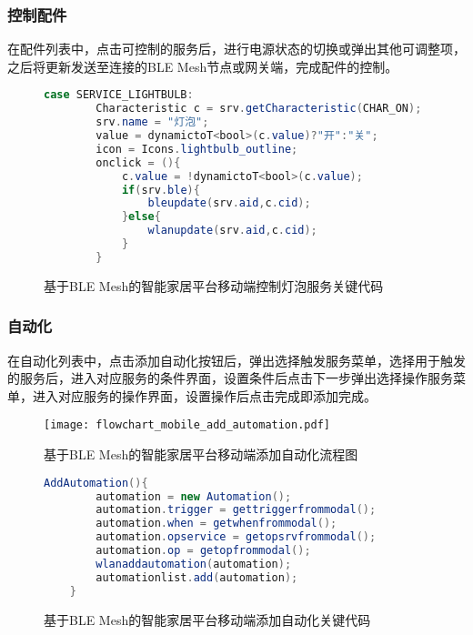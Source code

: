 \subsubsection{控制配件}
在配件列表中，点击可控制的服务后，进行电源状态的切换或弹出其他可调整项，之后将更新发送至连接的BLE Mesh节点或网关端，完成配件的控制。

\begin{figure}[H]
    \centering
    \begin{lstlisting}[language=Java]
    case SERVICE_LIGHTBULB:
        Characteristic c = srv.getCharacteristic(CHAR_ON);
        srv.name = "灯泡";
        value = dynamictoT<bool>(c.value)?"开":"关";
        icon = Icons.lightbulb_outline;
        onclick = (){
            c.value = !dynamictoT<bool>(c.value);
            if(srv.ble){
                bleupdate(srv.aid,c.cid);
            }else{
                wlanupdate(srv.aid,c.cid);
            }
        }
    \end{lstlisting}
    \caption{基于BLE Mesh的智能家居平台移动端控制灯泡服务关键代码}
    \label{fig:code_mobile_control_lightbulb}
\end{figure}

\subsubsection{自动化}
在自动化列表中，点击添加自动化按钮后，弹出选择触发服务菜单，选择用于触发的服务后，进入对应服务的条件界面，设置条件后点击下一步弹出选择操作服务菜单，进入对应服务的操作界面，设置操作后点击完成即添加完成。

\begin{figure}[H]
    \centering
    \texttt{[image: flowchart\_mobile\_add\_automation.pdf]}
    \caption{基于BLE Mesh的智能家居平台移动端添加自动化流程图}
    \label{fig:flowchart_mobile_connect}
\end{figure}

\begin{figure}[H]
    \centering
    \begin{lstlisting}[language=Java]
    AddAutomation(){
        automation = new Automation();
        automation.trigger = gettriggerfrommodal();
        automation.when = getwhenfrommodal();
        automation.opservice = getopsrvfrommodal();
        automation.op = getopfrommodal();
        wlanaddautomation(automation);
        automationlist.add(automation);
    }
    \end{lstlisting}
    \caption{基于BLE Mesh的智能家居平台移动端添加自动化关键代码}
    \label{fig:code_mobile_add_automation}
\end{figure}